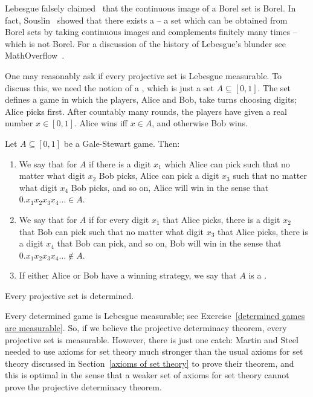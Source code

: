 \begin{subsec}
Lebesgue falsely claimed~\cite{Lebesgue1905} that the continuous image of a Borel set is Borel.
In fact, Souslin~\cite{Souslin1917} showed that there exists a  -- a set which can be obtained from Borel sets by taking continuous images and complements finitely many times -- which is not Borel.
For a discussion of the history of Lebesgue's blunder see MathOverflow~\cite{MO34142}.
\end{subsec}

\begin{subsec}
One may reasonably ask if every projective set is Lebesgue measurable.
To discuss this, we need the notion of a , which is just a set $A \subseteq [0, 1]$.
The set defines a game in which the players, Alice and Bob, take turns choosing digits; Alice picks first.
After countably many rounds, the players have given a real number $x \in [0, 1]$.
Alice wins iff $x \in A$, and otherwise Bob wins.
\end{subsec}

\begin{definition}
Let $A \subseteq [0, 1]$ be a Gale-Stewart game. Then:
\begin{enumerate}
\item We say that  for $A$ if there is a digit $x_1$ which Alice can pick such that no matter what digit $x_2$ Bob picks, Alice can pick a digit $x_3$ such that no matter what digit $x_4$ Bob picks, and so on, Alice will win in the sense that $0.x_1x_2x_3x_4\dots \in A$.
\item We say that  for $A$ if for every digit $x_1$ that Alice picks, there is a digit $x_2$ that Bob can pick such that no matter what digit $x_3$ that Alice picks, there is a digit $x_4$ that Bob can pick, and so on, Bob will win in the sense that $0.x_1x_2x_3x_4\dots \notin A$.
\item If either Alice or Bob have a winning strategy, we say that $A$ is a .
\end{enumerate}
\end{definition}

\begin{theorem}
Every projective set is determined.
\end{theorem}

\begin{subsec}
Every determined game is Lebesgue measurable; see Exercise~\ref{determined games are measurable}.
So, if we believe the projective determinacy theorem, every projective set is measurable.
However, there is just one catch: Martin and Steel needed to use axioms for set theory much stronger than the usual axioms for set theory discussed in Section~\ref{axioms of set theory} to prove their theorem, and this is optimal in the sense that a weaker set of axioms for set theory cannot prove the projective determinacy theorem.
\end{subsec}

